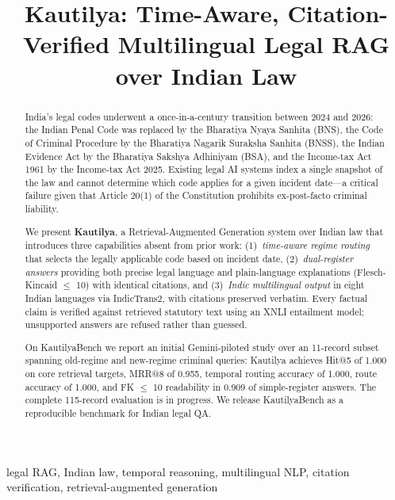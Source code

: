\documentclass[conference]{IEEEtran}
\begin{document}
\title{Kautilya: Time-Aware, Citation-Verified Multilingual Legal RAG over Indian Law}

\author{
}

\maketitle

\begin{abstract}
India's legal codes underwent a once-in-a-century transition between 2024 and 2026: the Indian Penal Code was replaced by the Bharatiya Nyaya Sanhita (BNS), the Code of Criminal Procedure by the Bharatiya Nagarik Suraksha Sanhita (BNSS), the Indian Evidence Act by the Bharatiya Sakshya Adhiniyam (BSA), and the Income-tax Act 1961 by the Income-tax Act 2025. Existing legal AI systems index a single snapshot of the law and cannot determine which code applies for a given incident date---a critical failure given that Article 20(1) of the Constitution prohibits ex-post-facto criminal liability.

We present \textbf{Kautilya}, a Retrieval-Augmented Generation system over Indian law that introduces three capabilities absent from prior work: (1)~\emph{time-aware regime routing} that selects the legally applicable code based on incident date, (2)~\emph{dual-register answers} providing both precise legal language and plain-language explanations (Flesch-Kincaid $\leq$ 10) with identical citations, and (3)~\emph{Indic multilingual output} in eight Indian languages via IndicTrans2, with citations preserved verbatim. Every factual claim is verified against retrieved statutory text using an XNLI entailment model; unsupported answers are refused rather than guessed.

On KautilyaBench we report an initial Gemini-piloted study over an 11-record subset spanning old-regime and new-regime criminal queries: Kautilya achieves Hit@5 of 1.000 on core retrieval targets, MRR@8 of 0.955, temporal routing accuracy of 1.000, route accuracy of 1.000, and FK $\leq$ 10 readability in 0.909 of simple-register answers. The complete 115-record evaluation is in progress. We release KautilyaBench as a reproducible benchmark for Indian legal QA.
\end{abstract}

\begin{IEEEkeywords}
legal RAG, Indian law, temporal reasoning, multilingual NLP, citation verification, retrieval-augmented generation
\end{IEEEkeywords}
\end{document}
